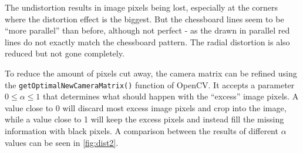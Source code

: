 The undistortion results in image pixels being lost, especially at the corners where the distortion effect is the biggest. But the chessboard lines seem to be \enquote{more parallel} than before, although not perfect - as the drawn in parallel red lines do not exactly match the chessboard pattern. The radial distortion is also reduced but not gone completely.

To reduce the amount of pixels cut away, the camera matrix can be refined using the \texttt{getOptimalNewCameraMatrix()} function of OpenCV. It accepts a parameter $0 \leq \alpha \leq 1$ that determines what should happen with the \enquote{excess} image pixels. \cite{cv_calibratecamera} A value close to 0 will discard most excess image pixels and crop into the image, while a value close to 1 will keep the excess pixels and instead fill the missing information with black pixels. A comparison between the results of different $\alpha$ values can be seen in \autoref{fig:dist2}.

